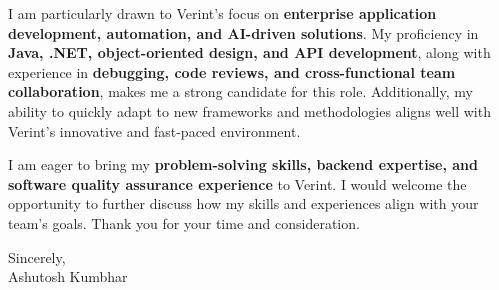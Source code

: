 \documentclass[11pt]{article}
\begin{document}
I am particularly drawn to Verint’s focus on \textbf{enterprise application development, automation, and AI-driven solutions}. My proficiency in \textbf{Java, .NET, object-oriented design, and API development}, along with experience in \textbf{debugging, code reviews, and cross-functional team collaboration}, makes me a strong candidate for this role. Additionally, my ability to quickly adapt to new frameworks and methodologies aligns well with Verint’s innovative and fast-paced environment.

I am eager to bring my \textbf{problem-solving skills, backend expertise, and software quality assurance experience} to Verint. I would welcome the opportunity to further discuss how my skills and experiences align with your team’s goals. Thank you for your time and consideration.

Sincerely, \\
Ashutosh Kumbhar
\end{document}
